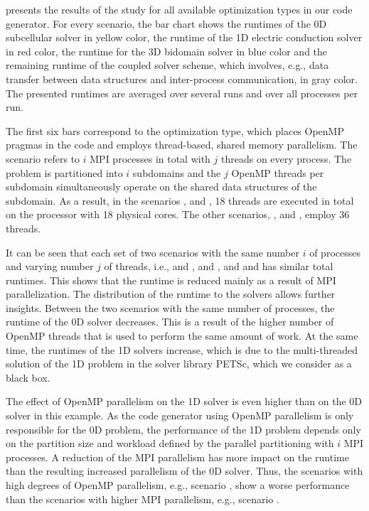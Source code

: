  presents the results of the study for all available optimization types in our code generator. For every scenario, the bar chart shows the runtimes of the 0D subcellular solver in yellow color, the runtime of the 1D electric conduction solver in red color, the runtime for the 3D bidomain solver in blue color and the remaining runtime of the coupled solver scheme, which involves, e.g., data transfer between data structures and inter-process communication, in gray color.
The presented runtimes are averaged over several runs and over all processes per run.

The first six bars correspond to the  optimization type, which places OpenMP pragmas in the code and employs thread-based, shared memory parallelism. The scenario  refers to $i$ MPI processes in total with $j$ threads on every process. The problem is partitioned into $i$ subdomains and the $j$ OpenMP threads per subdomain simultaneously operate on the shared data structures of the subdomain.
As a result, in the scenarios ,  and , 18 threads are executed in total on the processor with 18 physical cores. The other scenarios, ,  and , employ 36 threads.

It can be seen that each set of two scenarios with the same number $i$ of processes and varying number $j$ of threads, i.e.,  and ,  and , and  and  has similar total runtimes. This shows that the runtime is reduced mainly as a result of MPI parallelization. The distribution of the runtime to the solvers allows further insights. Between the two scenarios with the same number of processes, the runtime of the 0D solver decreases. This is a result of the higher number of OpenMP threads that is used to perform the same amount of work. At the same time, the runtimes of the 1D solvers increase, which is due to the multi-threaded solution of the 1D problem in the solver library PETSc, which we consider as a black box.

The effect of OpenMP parallelism on the 1D solver is even higher than on the 0D solver in this example. As the code generator using OpenMP parallelism is only responsible for the 0D problem, the performance of the 1D problem depends only on the partition size and workload defined by the parallel partitioning with $i$ MPI processes. A reduction of the MPI parallelism has more impact on the runtime than the resulting increased parallelism of the 0D solver. Thus, the scenarios with high degrees of OpenMP parallelism, e.g., scenario , show a worse performance than the scenarios with higher MPI parallelism, e.g., scenario .


